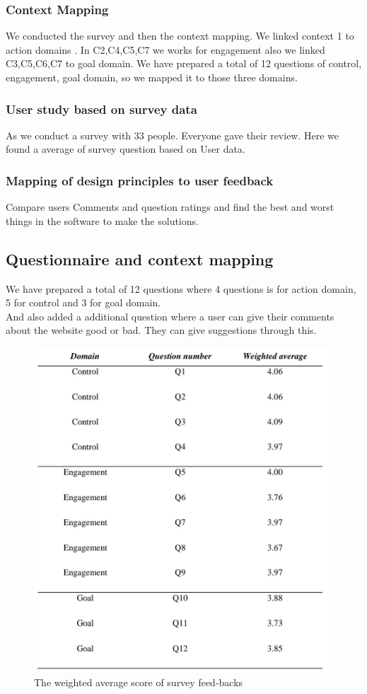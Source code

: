 \documentclass[runningheads]{llncs}
\begin{document}
\subsubsection{Context Mapping}
We conducted the survey and then the context mapping. We linked context 1 to action domains . In C2,C4,C5,C7 we works for engagement also we linked C3,C5,C6,C7 to goal domain. We have prepared a total of 12 questions of control, engagement, goal domain, so we mapped it to those three domains.
\subsubsection{User study based on survey data}
As we conduct a survey with 33 people. Everyone gave their review. Here we found a average of survey question based on User data.
\subsubsection{Mapping of design principles to user feedback}
Compare users Comments and question ratings and find the best and worst things in the software to make the solutions.
\newpage
\subsection{Questionnaire and context mapping}
We have prepared a total of 12 questions where 4 questions is for action domain, 5 for control and 3 for goal domain.\\And also added a additional question where a user can give their comments about the website good or bad. They can give suggestions through this.
\begin{figure}[h]
\centerline{\includegraphics[width=3 in]{question average.jpg}}
\caption{The weighted average score of survey feed-backs}
\label{table}
\end{figure}
\end{document}
